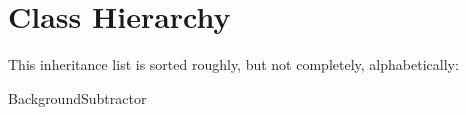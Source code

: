 \section{Class Hierarchy}
This inheritance list is sorted roughly, but not completely, alphabetically\+:\begin{DoxyCompactList}
\item Background\+Subtractor\begin{DoxyCompactList}
\item {}
\end{DoxyCompactList}
\end{DoxyCompactList}
